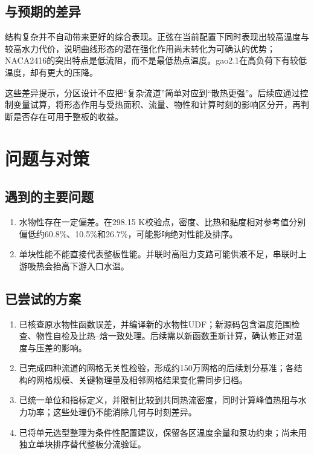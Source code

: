 \documentclass[stage2,fontset=fandol]{ydzjreport}
\begin{document}
\subsection{与预期的差异}
结构复杂并不自动带来更好的综合表现。正弦在当前配置下同时表现出较高温度与较高水力代价，说明曲线形态的潜在强化作用尚未转化为可确认的优势；NACA2416的突出特点是低流阻，而不是最低热点温度。gao2.1在高负荷下有较低温度，却有更大的压降。

这些差异提示，分区设计不应把“复杂流道”简单对应到“散热更强”。后续应通过控制变量试算，将形态作用与受热面积、流量、物性和计算时刻的影响区分开，再判断是否存在可用于整板的收益。

\section{问题与对策}
\subsection{遇到的主要问题}
\begin{enumerate}
\item 水物性存在一定偏差。在298.15 K校验点，密度、比热和黏度相对参考值分别偏低约60.8\%、10.5\%和26.7\%，可能影响绝对性能及排序。

\item 单块性能不能直接代表整板性能。并联时高阻力支路可能供液不足，串联时上游吸热会抬高下游入口水温。
\end{enumerate}

\subsection{已尝试的方案}
\begin{enumerate}
\item 已核查原水物性函数误差，并编译新的水物性UDF；新源码包含温度范围检查、物性自检及比热--焓一致处理。后续需以新函数重新计算，确认修正对温度与压差的影响。
\item 已完成四种流道的网格无关性检验，形成约150万网格的后续划分基准；各结构的网格规模、关键物理量及相邻网格结果变化需同步归档。
\item 已统一单位和指标定义，并限制比较到共同热流密度，同时计算峰值热阻与水力功率；这些处理仍不能消除几何与时刻差异。
\item 已将单元选型整理为条件性配置建议，保留各区温度余量和泵功约束；尚未用独立单块排序替代整板分流验证。
\end{enumerate}
\end{document}
